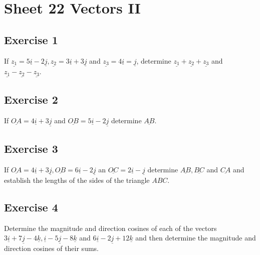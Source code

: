 \documentclass[
  11pt,
  oneside]{book}
\newcommand{\slide}{}
\theoremstyle{definition}
\theoremstyle{definition}
\theoremstyle{definition}
\theoremstyle{definition}
\theoremstyle{remark}
\begin{document}
\slide

\section{Sheet 22 Vectors II}\label{sheet-22-vectors-ii}

\subsection*{Exercise 1}\label{exercise-1-13}

If \(\underline{z_1} = 5\underline{i}-2\underline{j}, \underline{z_2} = 3\underline{i}+3\underline{j}\) and \(\underline{z_3}=4\underline{i}=\underline{j}\), determine \(\underline{z_1}+\underline{z_2}+\underline{z_3}\) and \(\underline{z_1}-\underline{z_2}-\underline{z_3}\).

\slide

\subsection*{Exercise 2}\label{exercise-2-13}

If \(\underline{OA}=4\underline{i}+3\underline{j}\) and \(\underline{OB}=5\underline{i}-2\underline{j}\) determine \(\underline{AB}\).

\slide

\subsection*{Exercise 3}\label{exercise-3-11}

If \(\underline{OA} = 4\underline{i}+3\underline{j}, \underline{OB}=6\underline{i}-2\underline{j}\) an \(\underline{OC}=2\underline{i}-\underline{j}\) determine \(\underline{AB}, \underline{BC}\) and \(\underline{CA}\) and establish the lengths of the sides of the triangle \(ABC\).

\slide

\subsection*{Exercise 4}\label{exercise-4-9}

Determine the magnitude and direction cosines of each of the vectors \(3\underline{i}+7\underline{j}-4\underline{k}, \underline{i}-5\underline{j}-8\underline{k}\) and \(6\underline{i}-2\underline{j}+12\underline{k}\) and then determine the magnitude and direction cosines of their sums.
\end{document}
